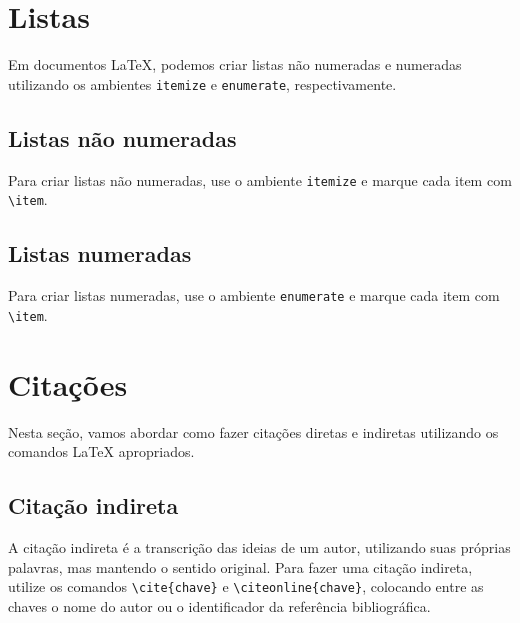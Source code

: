 \section{Listas}
\label{sec:listas}

Em documentos \LaTeX, podemos criar listas não numeradas e numeradas utilizando os ambientes \verb|itemize| e \verb|enumerate|, respectivamente.

\subsection{Listas não numeradas}
\label{subsec:listasNaoNumeradas}
\noindent
Para criar listas não numeradas, use o ambiente \verb|itemize| e marque cada item com \verb|\item|.



\subsection{Listas numeradas}
\label{subsec:listasNumeradas}
\noindent
Para criar listas numeradas, use o ambiente \verb|enumerate| e marque cada item com \verb|\item|.



\section{Citações}
\label{sec:citacoes}

Nesta seção, vamos abordar como fazer citações diretas e indiretas utilizando os comandos \LaTeX{} apropriados.

\subsection{Citação indireta}
\label{subsec:citacaoIndireta}

A citação indireta é a transcrição das ideias de um autor, utilizando suas próprias palavras, mas mantendo o sentido original. Para fazer uma citação indireta, utilize os comandos \verb|\cite{chave}| e \verb|\citeonline{chave}|, colocando entre as chaves o nome do autor ou o identificador da referência bibliográfica.

